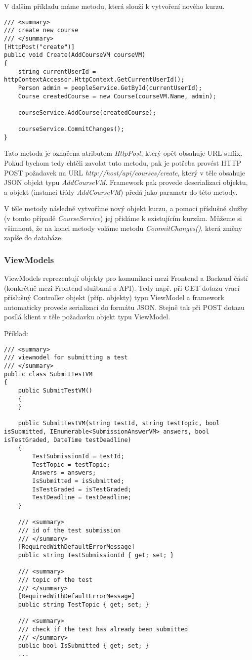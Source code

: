 V dalším příkladu máme metodu, která slouží k vytvoření nového kurzu.
\begin{lstlisting}
/// <summary>
/// create new course
/// </summary>
[HttpPost("create")]
public void Create(AddCourseVM courseVM)
{
	string currentUserId = httpContextAccessor.HttpContext.GetCurrentUserId();
	Person admin = peopleService.GetById(currentUserId);
	Course createdCourse = new Course(courseVM.Name, admin);
	
	courseService.AddCourse(createdCourse);
	
	courseService.CommitChanges();
}
\end{lstlisting}
Tato metoda je označena atributem \textit{HttpPost}, který opět obsahuje URL suffix. Pokud bychom tedy chtěli zavolat tuto metodu, pak je potřeba provést HTTP POST požadavek na URL
\newline
\textit{http://host/api/courses/create}, který v těle obsahuje JSON objekt typu \textit{AddCourseVM}. Framework pak provede deserializaci objektu, a objekt (instanci třídy \textit{AddCourseVM}) předá jako parametr do této metody.

V těle metody následně vytvoříme nový objekt kurzu, a pomocí příslušné služby (v tomto případě \textit{CourseService}) jej přidáme k existujícím kurzům. Můžeme si všimnout, že na konci metody voláme metodu \textit{CommitChanges()}, která změny zapíše do databáze.

\subsubsection*{ViewModels}
\label{serverVM}

ViewModels reprezentují objekty pro komunikaci mezi Frontend a Backend částí (konkrétně mezi Frontend službami a API). Tedy např. při GET dotazu vrací příslušný Controller objekt (příp. objekty) typu ViewModel a framework automaticky provede serializaci do formátu JSON. Stejně tak při POST dotazu posílá klient v těle požadavku objekt typu ViewModel.

Příklad:
\begin{lstlisting}
/// <summary>
/// viewmodel for submitting a test
/// </summary>
public class SubmitTestVM
{
	public SubmitTestVM()
	{
	}
	
	public SubmitTestVM(string testId, string testTopic, bool isSubmitted, IEnumerable<SubmissionAnswerVM> answers, bool isTestGraded, DateTime testDeadline)
	{
		TestSubmissionId = testId;
		TestTopic = testTopic;
		Answers = answers;
		IsSubmitted = isSubmitted;
		IsTestGraded = isTestGraded;
		TestDeadline = testDeadline;
	}
	
	/// <summary>
	/// id of the test submission
	/// </summary>
	[RequiredWithDefaultErrorMessage]
	public string TestSubmissionId { get; set; }
	
	/// <summary>
	/// topic of the test
	/// </summary>
	[RequiredWithDefaultErrorMessage]
	public string TestTopic { get; set; }
	
	/// <summary>
	/// check if the test has already been submitted
	/// </summary>
	public bool IsSubmitted { get; set; }
	...
\end{lstlisting}

